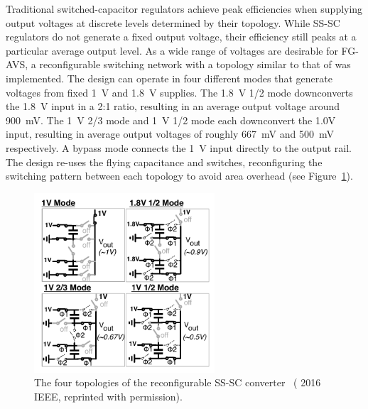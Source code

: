 \documentclass[graybox]{svmult}
\begin{document}
Traditional switched-capacitor regulators achieve peak efficiencies when supplying output voltages at discrete levels determined by their topology.
While SS-SC regulators do not generate a fixed output voltage, their efficiency still peaks at a particular average output level.
As a wide range of voltages are desirable for FG-AVS, a reconfigurable switching network with a topology similar to that of \cite{Le2011} was implemented.
The design can operate in four different modes that generate voltages from fixed \SI{1}{\volt} and \SI{1.8}{\volt} supplies.
The \SI{1.8}{\volt} 1/2 mode downconverts the \SI{1.8}{\volt} input in a 2:1 ratio, resulting in an average output voltage around \SI{900}{\milli\volt}.
The \SI{1}{\volt} 2/3 mode and \SI{1}{\volt} 1/2 mode each downconvert the 1.0V input, resulting in average output voltages of roughly \SI{667}{\milli\volt} and \SI{500}{\milli\volt} respectively.
A bypass mode connects the \SI{1}{\volt} input directly to the output rail.
The design re-uses the flying capacitance and switches, reconfiguring the switching pattern between each topology to avoid area overhead (see Figure~\ref{fig:3-dcdc-topologies}).

\begin{figure}
  \centering
  \includegraphics[width=0.6\textwidth]{3-dcdc-topologies}
  \caption{The four topologies of the reconfigurable SS-SC converter~\cite{Zimmer2016} ({\textcopyright} 2016 IEEE, reprinted with permission).}
  \label{fig:3-dcdc-topologies}
\end{figure}
\end{document}
